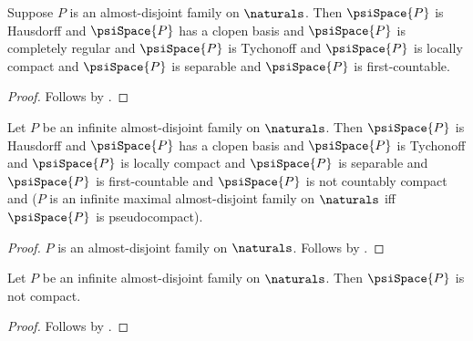 \begin{theorem}\label{psi_space_structural_theorem}
    Suppose $P$ is an almost-disjoint family on $\naturals$.
    Then $\psiSpace{P}$ is Hausdorff and
        $\psiSpace{P}$ has a clopen basis and
        $\psiSpace{P}$ is completely regular and
        $\psiSpace{P}$ is Tychonoff and
        $\psiSpace{P}$ is locally compact and
        $\psiSpace{P}$ is separable and
        $\psiSpace{P}$ is first-countable.
\end{theorem}
\begin{proof}
    Follows by
        .
\end{proof}

\begin{theorem}\label{isbell_mrowka_space_theorem}
    Let $P$ be an infinite almost-disjoint family on $\naturals$.
    Then $\psiSpace{P}$ is Hausdorff and
        $\psiSpace{P}$ has a clopen basis and
        $\psiSpace{P}$ is Tychonoff and
        $\psiSpace{P}$ is locally compact and
        $\psiSpace{P}$ is separable and
        $\psiSpace{P}$ is first-countable and
        $\psiSpace{P}$ is not countably compact and
        ($P$ is an infinite maximal almost-disjoint family on $\naturals$ iff
            $\psiSpace{P}$ is pseudocompact).
\end{theorem}
\begin{proof}
    $P$ is an almost-disjoint family on $\naturals$.
    Follows by
        .
\end{proof}

\begin{corollary}\label{isbell_mrowka_space_is_not_compact}
    Let $P$ be an infinite almost-disjoint family on $\naturals$.
    Then $\psiSpace{P}$ is not compact.
\end{corollary}
\begin{proof}
    Follows by .
\end{proof}

